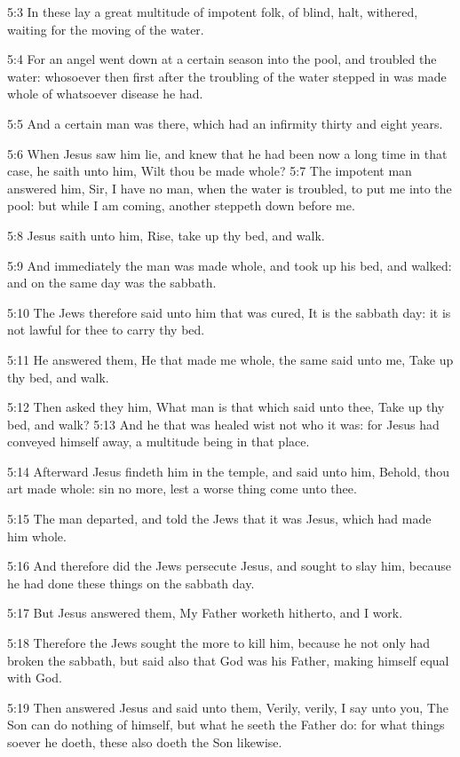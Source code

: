 5:3 In these lay a great multitude of impotent folk, of blind, halt,
withered, waiting for the moving of the water.

5:4 For an angel went down at a certain season into the pool, and
troubled the water: whosoever then first after the troubling of the
water stepped in was made whole of whatsoever disease he had.

5:5 And a certain man was there, which had an infirmity thirty and
eight years.

5:6 When Jesus saw him lie, and knew that he had been now a long time
in that case, he saith unto him, Wilt thou be made whole?  5:7 The
impotent man answered him, Sir, I have no man, when the water is
troubled, to put me into the pool: but while I am coming, another
steppeth down before me.

5:8 Jesus saith unto him, Rise, take up thy bed, and walk.

5:9 And immediately the man was made whole, and took up his bed, and
walked: and on the same day was the sabbath.

5:10 The Jews therefore said unto him that was cured, It is the
sabbath day: it is not lawful for thee to carry thy bed.

5:11 He answered them, He that made me whole, the same said unto me,
Take up thy bed, and walk.

5:12 Then asked they him, What man is that which said unto thee, Take
up thy bed, and walk?  5:13 And he that was healed wist not who it
was: for Jesus had conveyed himself away, a multitude being in that
place.

5:14 Afterward Jesus findeth him in the temple, and said unto him,
Behold, thou art made whole: sin no more, lest a worse thing come unto
thee.

5:15 The man departed, and told the Jews that it was Jesus, which had
made him whole.

5:16 And therefore did the Jews persecute Jesus, and sought to slay
him, because he had done these things on the sabbath day.

5:17 But Jesus answered them, My Father worketh hitherto, and I work.

5:18 Therefore the Jews sought the more to kill him, because he not
only had broken the sabbath, but said also that God was his Father,
making himself equal with God.

5:19 Then answered Jesus and said unto them, Verily, verily, I say
unto you, The Son can do nothing of himself, but what he seeth the
Father do: for what things soever he doeth, these also doeth the Son
likewise.


